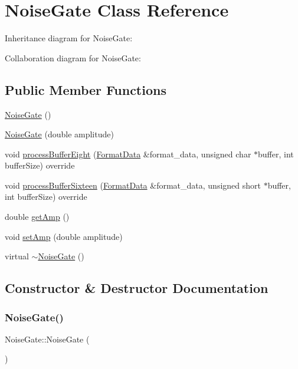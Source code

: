 \hypertarget{classNoiseGate}{}\section{Noise\+Gate Class Reference}
\label{classNoiseGate}


Inheritance diagram for Noise\+Gate\+:


Collaboration diagram for Noise\+Gate\+:
\subsection*{Public Member Functions}
\begin{DoxyCompactItemize}
\item 
\hyperlink{classNoiseGate_ae9ccbe5934108f756ada0e492db5f71e}{Noise\+Gate} ()
\item 
\hyperlink{classNoiseGate_a254a2b41b16d3e647067d03e76af18da}{Noise\+Gate} (double amplitude)
\item 
void \hyperlink{classNoiseGate_a9d345943286cd00cdd4253f59ac37bd9}{process\+Buffer\+Eight} (\hyperlink{structFormatData}{Format\+Data} \&format\+\_\+data, unsigned char $\ast$buffer, int buffer\+Size) override
\item 
void \hyperlink{classNoiseGate_a3783dd6711323ae98c081256b6bb05ee}{process\+Buffer\+Sixteen} (\hyperlink{structFormatData}{Format\+Data} \&format\+\_\+data, unsigned short $\ast$buffer, int buffer\+Size) override
\item 
double \hyperlink{classNoiseGate_aa3bc6ff59a5448071d8b78ece44190e7}{get\+Amp} ()
\item 
void \hyperlink{classNoiseGate_af4c52da4c68bb5d94cfcf1eabc8a4544}{set\+Amp} (double amplitude)
\item 
virtual \hyperlink{classNoiseGate_abcdf1888710c86086b1a595189191afd}{$\sim$\+Noise\+Gate} ()
\end{DoxyCompactItemize}


\subsection{Constructor \& Destructor Documentation}
\mbox{\label{classNoiseGate_ae9ccbe5934108f756ada0e492db5f71e}} 
\subsubsection{\texorpdfstring{Noise\+Gate()}{NoiseGate()}\hspace{0.1cm}{\footnotesize\ttfamily [1/2]}}
{\footnotesize\ttfamily Noise\+Gate\+::\+Noise\+Gate (\begin{DoxyParamCaption}{ }\end{DoxyParamCaption})}

